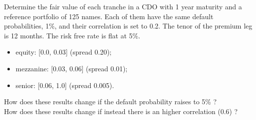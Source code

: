 \begin{question}
Determine the fair value of each tranche in a CDO with 1 year maturity and a reference portfolio of 125 names. Each of them have the same default probabilities, 1\%, and their correlation is set to 0.2. The tenor of the premium leg is 12 months. The risk free rate is flat at 5\%.
\begin{itemize}
	\item equity: [0.0, 0.03] (spread 0.20);
	\item mezzanine: [0.03, 0.06] (spread 0.01);
	\item senior: [0.06, 1.0] (spread 0.005).
\end{itemize}
How does these results change if the default probability raises to 5\% ? \\
How does these results change if instead there is an higher correlation (0.6) ?
\end{question}

